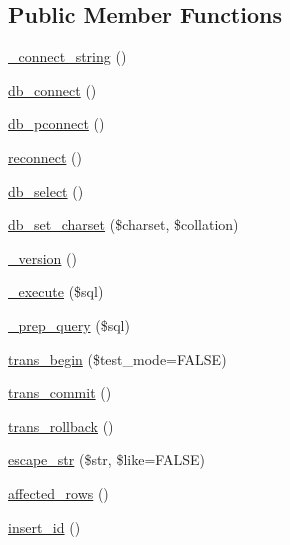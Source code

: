 \subsection*{Public Member Functions}
\begin{DoxyCompactItemize}
\item 
\hyperlink{class_c_i___d_b__postgre__driver_a479f808d32aa5e1ac2ca8acd753f5115}{\-\_\-connect\-\_\-string} ()
\item 
\hyperlink{class_c_i___d_b__postgre__driver_a6aa545dcb7768f0b62d37cdcf7f09adc}{db\-\_\-connect} ()
\item 
\hyperlink{class_c_i___d_b__postgre__driver_a0f69e662bd02de5bcf98647068e7c653}{db\-\_\-pconnect} ()
\item 
\hyperlink{class_c_i___d_b__postgre__driver_a57c19c642ab3023e28d10c50f86ff0a8}{reconnect} ()
\item 
\hyperlink{class_c_i___d_b__postgre__driver_af0c7f2602586ea2050b19fb36baefb24}{db\-\_\-select} ()
\item 
\hyperlink{class_c_i___d_b__postgre__driver_adc8cd12121dc8edda3adcadd88a97e24}{db\-\_\-set\-\_\-charset} (\$charset, \$collation)
\item 
\hyperlink{class_c_i___d_b__postgre__driver_ac997a462bb342f97f414910f0e033fb6}{\-\_\-version} ()
\item 
\hyperlink{class_c_i___d_b__postgre__driver_a114ab675d89bf8324a41785fb475e86d}{\-\_\-execute} (\$sql)
\item 
\hyperlink{class_c_i___d_b__postgre__driver_a86af88ef0fa6d44ab4691e3f53270339}{\-\_\-prep\-\_\-query} (\$sql)
\item 
\hyperlink{class_c_i___d_b__postgre__driver_a90e153cf190d273336d77cce930587e1}{trans\-\_\-begin} (\$test\-\_\-mode=F\-A\-L\-S\-E)
\item 
\hyperlink{class_c_i___d_b__postgre__driver_af4fbdcdace4aa94a139b64877601fe9b}{trans\-\_\-commit} ()
\item 
\hyperlink{class_c_i___d_b__postgre__driver_a53f76d4dfcd6ac04fb653982442aeef8}{trans\-\_\-rollback} ()
\item 
\hyperlink{class_c_i___d_b__postgre__driver_aaba16891c8c93600a87075800cc5b72b}{escape\-\_\-str} (\$str, \$like=F\-A\-L\-S\-E)
\item 
\hyperlink{class_c_i___d_b__postgre__driver_a77248aaad33eb132c04cc4aa3f4bc8cb}{affected\-\_\-rows} ()
\item 
\hyperlink{class_c_i___d_b__postgre__driver_a933f2cde8dc7f87875e257d0a4902e99}{insert\-\_\-id} ()
\item 

\end{DoxyCompactItemize}
